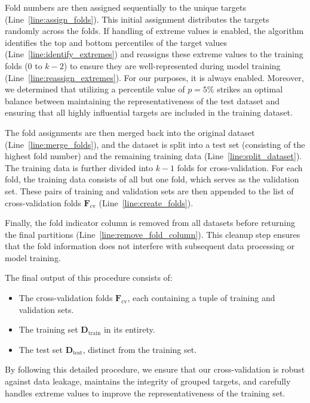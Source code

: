 Fold numbers are then assigned sequentially to the unique targets (Line~\ref{line:assign_folds}).
This initial assignment distributes the targets randomly across the folds.
If handling of extreme values is enabled, the algorithm identifies the top and bottom percentiles of the target values (Line~\ref{line:identify_extremes}) and reassigns these extreme values to the training folds (0 to \( k-2 \)) to ensure they are well-represented during model training (Line~\ref{line:reassign_extremes}).
For our purposes, it is always enabled.
Moreover, we determined that utilizing a percentile value of $p=5\%$ strikes an optimal balance between maintaining the representativeness of the test dataset and ensuring that all highly influential targets are included in the training dataset.

The fold assignments are then merged back into the original dataset (Line~\ref{line:merge_folds}), and the dataset is split into a test set (consisting of the highest fold number) and the remaining training data (Line~\ref{line:split_dataset}).
The training data is further divided into \( k-1 \) folds for cross-validation.
For each fold, the training data consists of all but one fold, which serves as the validation set.
These pairs of training and validation sets are then appended to the list of cross-validation folds \(\mathbf{F}_\text{cv}\) (Line~\ref{line:create_folds}).

Finally, the fold indicator column is removed from all datasets before returning the final partitions (Line~\ref{line:remove_fold_column}).
This cleanup step ensures that the fold information does not interfere with subsequent data processing or model training.

The final output of this procedure consists of:
\begin{itemize}
    \item The cross-validation folds \(\mathbf{F}_\text{cv}\), each containing a tuple of training and validation sets.
    \item The training set \(\mathbf{D}_\text{train}\) in its entirety.
    \item The test set \(\mathbf{D}_\text{test}\), distinct from the training set.
\end{itemize}

By following this detailed procedure, we ensure that our cross-validation is robust against data leakage, maintains the integrity of grouped targets, and carefully handles extreme values to improve the representativeness of the training set.

